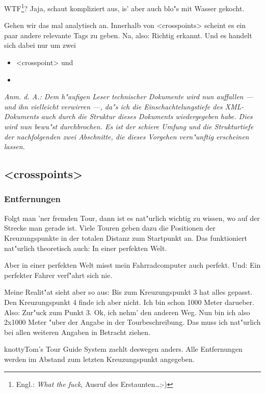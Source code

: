 WTF\footnote{Engl.: \textit{What the fuck}, Ausruf des Erstaunten\ldots ;-)}?
Jaja, schaut kompliziert aus, is' aber auch blo"s mit Wasser
gekocht.

Gehen wir das mal analytisch an. Innerhalb von <crosspoints> 
scheint es ein paar andere relevante Tags zu geben. Na, also:
Richtig erkannt. Und es handelt sich dabei nur um zwei
\begin{itemize}
\item <crosspoint> und
\item <track-info>
\end{itemize}


\begin{footnotesize}
\textit{Anm. d. A.: Dem h"aufigen Leser technischer Dokumente wird nun auffallen --- 
und ihn vielleicht verwirren ---, da"s ich die Einschachtelungstiefe des XML-Dokuments
auch durch die Struktur dieses Dokuments wiedergegeben habe. Dies wird nun bewu"st 
durchbrochen. Es ist der schiere Umfung und die Strukturtiefe der nachfolgenden 
zwei Abschnitte, die dieses Vorgehen vern"unftig erscheinen lassen.}
\end{footnotesize}


\subsection{<crosspoints>}

\subsubsection{Entfernungen}\label{sec:crosspoints-distances-explained}
Folgt man 'ner fremden Tour, dann ist es nat"urlich wichtig zu
wissen, wo auf der Strecke man gerade ist. Viele Touren geben dazu
die Positionen der Kreuzungspunkte in der totalen Distanz zum
Startpunkt an. Das funktioniert nat"urlich theoretisch auch: In
einer perfekten Welt.

Aber in einer perfekten Welt misst mein Fahrradcomputer auch perfekt.
Und: Ein perfekter Fahrer verf"ahrt sich nie.

Meine Realit"at sieht aber so aus: Bis zum Kreuzungspunkt 3 hat alles
gepasst. Den Kreuzungspunkt 4 finde ich aber nicht. Ich bin schon 
1000 Meter darueber. Also: Zur"uck zum Punkt 3. Ok, ich nehm' den
anderen Weg. Nun bin ich also 2x1000 Meter "uber der Angabe in der
Tourbeschreibung. Das muss ich nat"urlich bei allen weiteren Angaben
in Betracht ziehen.

knottyTom's Tour Guide System zaehlt deswegen anders. Alle Entfernungen
werden im Abstand zum letzten Kreuzungspunkt angegeben.




